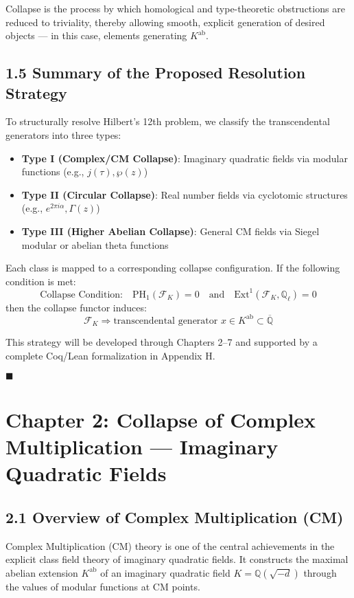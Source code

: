 \documentclass[11pt]{article}
\begin{document}
Collapse is the process by which homological and type-theoretic obstructions are reduced to triviality, thereby allowing smooth, explicit generation of desired objects — in this case, elements generating \( K^{\mathrm{ab}} \).

\subsection{1.5 Summary of the Proposed Resolution Strategy}

To structurally resolve Hilbert's 12th problem, we classify the transcendental generators into three types:

\begin{itemize}
    \item \textbf{Type I (Complex/CM Collapse)}: Imaginary quadratic fields via modular functions (e.g., \( j(\tau), \wp(z) \))
    \item \textbf{Type II (Circular Collapse)}: Real number fields via cyclotomic structures (e.g., \( e^{2\pi i \alpha}, \Gamma(z) \))
    \item \textbf{Type III (Higher Abelian Collapse)}: General CM fields via Siegel modular or abelian theta functions
\end{itemize}

Each class is mapped to a corresponding collapse configuration.  
If the following condition is met:
\[
\text{Collapse Condition:} \quad \mathrm{PH}_1(\mathcal{F}_K) = 0 \quad \text{and} \quad \mathrm{Ext}^1(\mathcal{F}_K, \mathbb{Q}_\ell) = 0
\]
then the collapse functor induces:
\[
\mathcal{F}_K \Rightarrow \text{transcendental generator } x \in K^{\mathrm{ab}} \subset \overline{\mathbb{Q}}
\]

This strategy will be developed through Chapters 2–7 and supported by a complete Coq/Lean formalization in Appendix H.

\hfill $\blacksquare$



\section{Chapter 2: Collapse of Complex Multiplication — Imaginary Quadratic Fields}

\subsection{2.1 Overview of Complex Multiplication (CM)}

Complex Multiplication (CM) theory is one of the central achievements in the explicit class field theory of imaginary quadratic fields. It constructs the maximal abelian extension \( K^{\mathrm{ab}} \) of an imaginary quadratic field \( K = \mathbb{Q}(\sqrt{-d}) \) through the values of modular functions at CM points.
\end{document}
